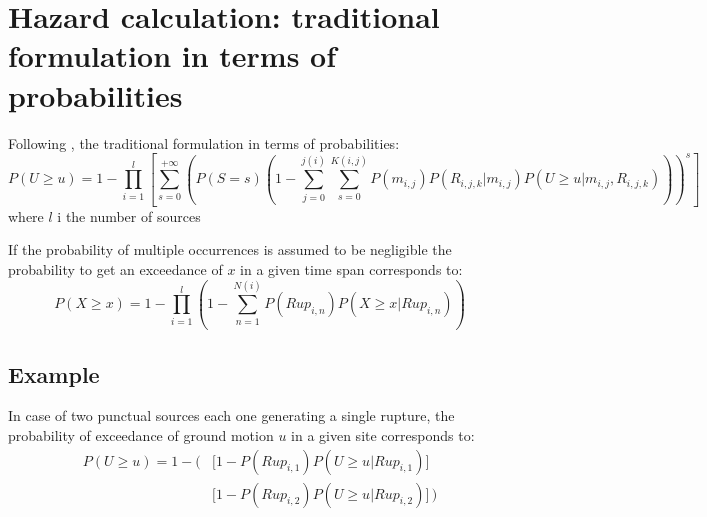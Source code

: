 %
\section{Hazard calculation: traditional formulation in terms of probabilities}
Following \cite{field2003}, the traditional formulation in terms of probabilities:
%
\begin{equation}
P(U\geq u)= 
	1-\prod\limits_{i=1}^{l} 
	\left[\sum\limits_{s=0}^{+\infty}
	\left(P(S=s) 
	\left(
		1-\sum\limits_{j=0}^{j(i)}\sum\limits_{s=0}^{K(i,j)} 
		P(m_{i,j}) 
		P(R_{i,j,k}|m_{i,j}) P(U\geq u|m_{i,j},R_{i,j,k})
	\right)
	\right)^{s}
	\right] 
\end{equation}
where $l$ i the number of sources 

If the probability of multiple occurrences is assumed to be negligible the 
probability to get an exceedance of $x$ in a given time span corresponds to:
%
\begin{equation}
P(X\geq x)=1-\prod\limits_{i=1}^{l} 
	\left( 
		1-\sum\limits_{n=1}^{N(i)}P(Rup_{i,n})P(X\geq x|Rup_{i,n})
	\right)
\end{equation}

\subsection{Example}
In case of two punctual sources each one generating a single rupture, the 
probability of exceedance of ground motion $u$ in a given site corresponds to:
%
\begin{eqnarray}
P(U\geq u)=
	1-
	\biggl(& 
		\bigl[ 1-P(Rup_{i,1})P(U\geq u|Rup_{i,1}) \bigr] \nonumber \\
		& \bigl[ 1-P(Rup_{i,2})P(U\geq u|Rup_{i,2}) \bigr]
	\,\biggr)
\end{eqnarray}